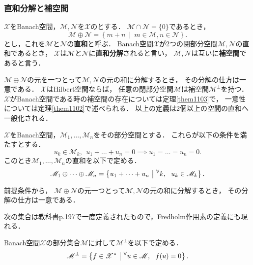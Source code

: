 \documentclass[a4j]{jsarticle}
\newcommand{\spX}{\mathscr{X}}
\newcommand{\spM}{\mathscr{M}}
\newcommand{\spN}{\mathscr{N}}
\newcommand{\set}[2]{\left\{#1~\middle|~#2\right\}}
\begin{document}
    \subsubsection{直和分解と補空間}
    \begin{Def}
        $\spX$をBanach空間，$\spM, \spN$を$\spX$のとする．
        $\spM \cap \spN=\{0\}$であるとき，
        \[ \spM \oplus \spN=\set{m+n}{m \in \spM, n \in \spN}. \]
        とし，これを$\spM$と$\spN$の\textbf{直和}と呼ぶ．
        Banach空間$\spX$が2つの閉部分空間$\spM, \spN$の直和であるとき，
        $\spX$は$\spM$と$\spN$に\textbf{直和分解}されると言い，
        $\spM, \spN$は互いに\textbf{補空間}であると言う．
    \end{Def}
    $\spM \oplus \spN$の元を一つとって$\spM, \spN$の元の和に分解するとき，
    その分解の仕方は一意である．
    $\spX$はHilbert空間ならば，
    任意の閉部分空間$\spM$は補空間$\spM^{\perp}$を持つ．
    $\spX$がBanach空間である時の補空間の存在については定理\ref{them1103}で，
    一意性については定理\ref{them1102}で述べられる．
    以上の定義は2個以上の空間の直和へ一般化される．
    \begin{Def}
        $\spX$をBanach空間，$\spM_1,\dots,\spM_n$をその部分空間とする．
        これらが以下の条件を満たすとする．
        \[ u_k \in \spM_k,~~ u_1+\dots+u_n=0 \implies u_1=\dots=u_n=0. \]
        このとき$\spM_1,\dots,\spM_n$の直和を以下で定める．
        \[
            \spM_1 \oplus \dots \oplus \spM_n
            =\set{u_1+\dots+u_n}{\Forall{k} u_k \in \spM_k}.
        \]
    \end{Def}
    前提条件から，
    $\spM \oplus \spN$の元一つとって$\spM, \spN$の元の和に分解するとき，
    その分解の仕方は一意である．

    次の集合は教科書p.197で一度定義されたもので，Fredholm作用素の定義にも現れる．
    \begin{Def}
        Banach空間$\spX$の部分集合$\spM$に対して$\spM^{\perp}$を以下で定める．
        \[ \spM^{\perp}=\set{f \in \spX^*}{\Forall{u \in \spM} f(u)=0}. \]
    \end{Def}
\end{document}
